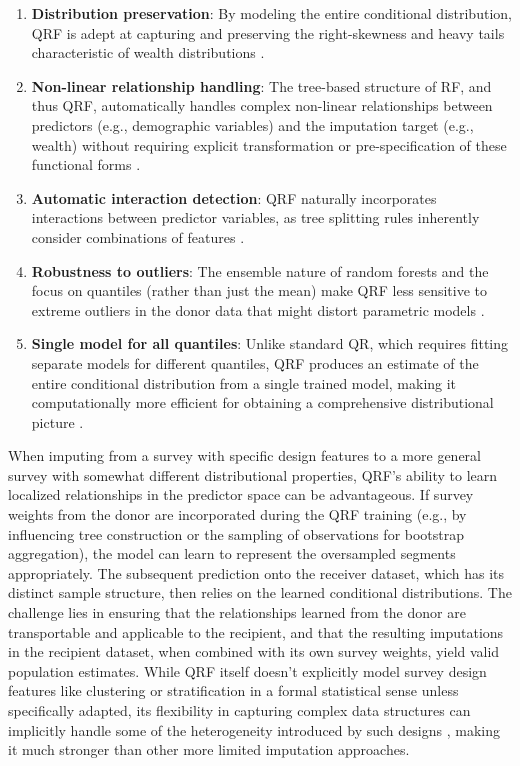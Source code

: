 \begin{enumerate}
    \item \textbf{Distribution preservation}: By modeling the entire conditional distribution, QRF is adept at capturing and preserving the right-skewness and heavy tails characteristic of wealth distributions \citep{meinshausen2006quantile}. 

    \item \textbf{Non-linear relationship handling}: The tree-based structure of RF, and thus QRF, automatically handles complex non-linear relationships between predictors (e.g., demographic variables) and the imputation target (e.g., wealth) without requiring explicit transformation or pre-specification of these functional forms \citep{tang2017random}.

    \item \textbf{Automatic interaction detection}: QRF naturally incorporates interactions between predictor variables, as tree splitting rules inherently consider combinations of features \citep{tang2017random}.

    \item \textbf{Robustness to outliers}:  The ensemble nature of random forests and the focus on quantiles (rather than just the mean) make QRF less sensitive to extreme outliers in the donor data that might distort parametric models \citep{learneconometricsfast2025quantile}.

    \item \textbf{Single model for all quantiles}: Unlike standard QR, which requires fitting separate models for different quantiles, QRF produces an estimate of the entire conditional distribution from a single trained model, making it computationally more efficient for obtaining a comprehensive distributional picture \citep{meinshausen2006quantile}.
\end{enumerate}

When imputing from a survey with specific design features to a more general survey with somewhat different distributional properties, QRF's ability to learn localized relationships in the predictor space can be advantageous. If survey weights from the donor are incorporated during the QRF training (e.g., by influencing tree construction or the sampling of observations for bootstrap aggregation), the model can learn to represent the oversampled segments appropriately. The subsequent prediction onto the receiver dataset, which has its distinct sample structure, then relies on the learned conditional distributions. The challenge lies in ensuring that the relationships learned from the donor are transportable and applicable to the recipient, and that the resulting imputations in the recipient dataset, when combined with its own survey weights, yield valid population estimates. While QRF itself doesn't explicitly model survey design features like clustering or stratification in a formal statistical sense unless specifically adapted, its flexibility in capturing complex data structures can implicitly handle some of the heterogeneity introduced by such designs \citep{hao2007quantile}, making it much stronger than other more limited imputation approaches.

